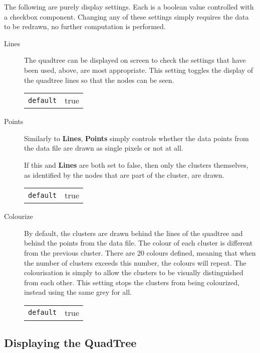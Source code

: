 The following are purely display settings. Each is a boolean value controlled
with a checkbox component. Changing any of these settings simply requires the
data to be redrawn, no further computation is performed.

\begin{description}

	\item[Lines] The quadtree can be displayed on screen to check the settings
		that have been used, above, are most appropriate. This setting toggles
		the display of the quadtree lines so that the nodes can be seen.

		\begin{tabular}{r l}
			\texttt{default} & true \\
		\end{tabular}

	\item[Points] Similarly to \textbf{Lines}, \textbf{Points} simply controls
		whether the data points from the data file are drawn as single pixels
		or not at all.

		If this and \textbf{Lines} are both set to false, then only the clusters
		themselves, as identified by the nodes that are part of the cluster,
		are drawn.

		\begin{tabular}{r l}
			\texttt{default} & true \\
		\end{tabular}

	\item[Colourize] By default, the clusters are drawn behind the lines of the
		quadtree and behind the points from the data file. The colour of each
		cluster is different from the previous cluster. There are 20 colours
		defined, meaning that when the number of clusters exceeds this number,
		the colours will repeat. The colourisation is simply to allow the
		clusters to be visually distinguished from each other. This setting
		stops the clusters from being colourized, instead using the same grey
		for all.

		\begin{tabular}{r l}
			\texttt{default} & true \\
		\end{tabular}

\end{description}

\subsection{Displaying the QuadTree}
\label{sub:displaying_the_quadtree}

